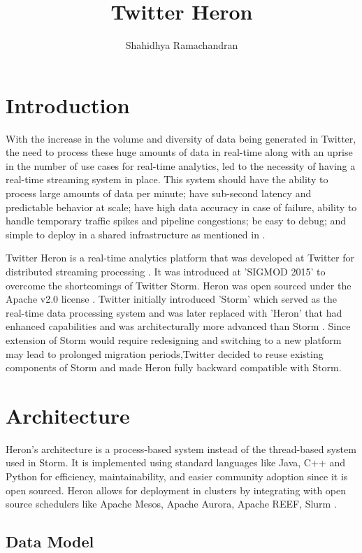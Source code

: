 \documentclass[9pt,twocolumn,twoside]{../../styles/osajnl}
\title{Twitter Heron}
\author[1]{Shahidhya Ramachandran}
\affil[1]{School of Informatics and Computing, Bloomington, IN 47408, U.S.A.}
\affil[*]{Corresponding authors: shahrama@iu.edu}
\begin{document}
\maketitle

\section{Introduction}

With the increase in the volume and diversity of data being generated in Twitter, the need to process these huge amounts of data in real-time along with an uprise in the number of use cases for real-time analytics, led to the necessity of having a real-time streaming system in place. This system should have the ability to process large amounts of data per minute; have sub-second latency and predictable behavior at scale; have high data accuracy in case of failure, ability to handle temporary traffic spikes and pipeline congestions; be easy to debug; and simple to deploy in a shared infrastructure as mentioned in \cite{TwitterHeron1}.

Twitter Heron is a real-time analytics platform that was developed at Twitter for distributed streaming processing \cite{www-openSourceHeron}. It was introduced at 'SIGMOD 2015' to overcome the shortcomings of Twitter Storm. Heron was open sourced under the Apache v2.0 license \cite{www-FlyFasterHeron}. Twitter initially introduced 'Storm' which served as the real-time data processing system and was later  replaced with 'Heron' that had enhanced capabilities and was architecturally more advanced than Storm \cite{www-FlyFasterHeron}. Since extension of Storm would require redesigning and switching to a new platform may lead to prolonged migration periods,Twitter decided to reuse existing components of Storm and made Heron fully backward compatible with Storm.  

\section{Architecture}
Heron's architecture is a process-based system instead of the thread-based system used in Storm. It is implemented using standard languages like Java, C++ and Python for efficiency, maintainability, and easier community adoption since it is open sourced. Heron allows for deployment in clusters by integrating with open source schedulers like Apache Mesos, Apache Aurora, Apache REEF, Slurm \cite{www-openSourceHeron}.

\subsection{Data Model}
\end{document}
